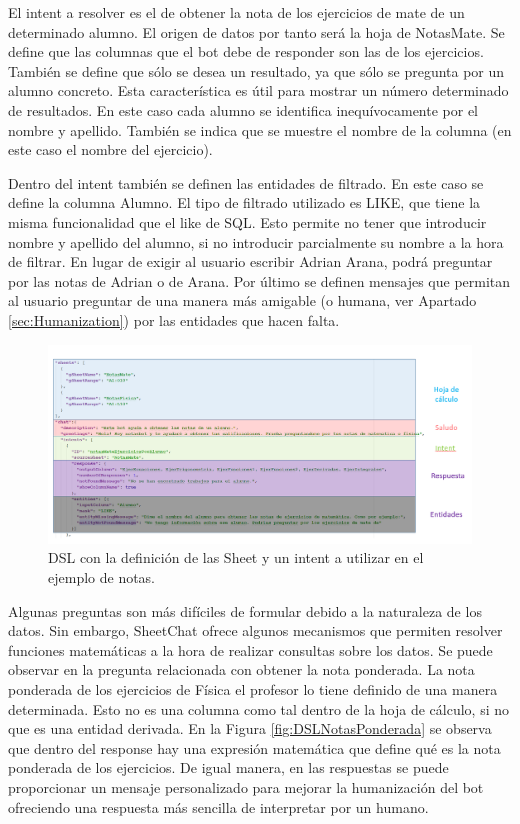 El intent a resolver es el de obtener la nota de los ejercicios de mate de un determinado alumno. El origen de datos por tanto será la hoja de NotasMate. Se define que las columnas que el bot debe de responder son las de los ejercicios. También se define que sólo se desea un resultado, ya que sólo se pregunta por un alumno concreto. Esta característica es útil para mostrar un número determinado de resultados. En este caso cada alumno se identifica inequívocamente por el nombre y apellido. También se indica que se muestre el nombre de la columna (en este caso el nombre del ejercicio).

Dentro del intent también se definen las entidades de filtrado. En este caso se define la columna Alumno. El tipo de filtrado utilizado es LIKE, que tiene la misma funcionalidad que el like de SQL. Esto permite no tener que introducir nombre y apellido del alumno, si no introducir parcialmente su nombre a la hora de filtrar. En lugar de exigir al usuario escribir Adrian Arana, podrá preguntar por las notas de Adrian o de Arana. Por último se definen mensajes que permitan al usuario preguntar de una manera más amigable (o humana, ver Apartado \ref{sec:Humanization}) por las entidades que hacen falta.

\begin{figure}[htb]
	\centering
	\includegraphics[width=1.2\textwidth]{./figs/DSLNotas.png}
	\caption{DSL con la definición de las Sheet y un intent a utilizar en el ejemplo de notas.}
	\label{fig:DSLNotas}
\end{figure}

Algunas preguntas son más difíciles de formular debido a la naturaleza de los datos. Sin embargo, SheetChat ofrece algunos mecanismos que permiten resolver funciones matemáticas a la hora de realizar consultas sobre los datos. Se puede observar en la pregunta relacionada con obtener la nota ponderada. La nota ponderada de los ejercicios de Física el profesor lo tiene definido de una manera determinada. Esto no es una columna como tal dentro de la hoja de cálculo, si no que es una entidad derivada. En la Figura \ref{fig:DSLNotasPonderada} se observa que dentro del response hay una expresión matemática que define qué es la nota ponderada de los ejercicios. De igual manera, en las respuestas se puede proporcionar un mensaje personalizado para mejorar la humanización del bot ofreciendo una respuesta más sencilla de interpretar por un humano.

